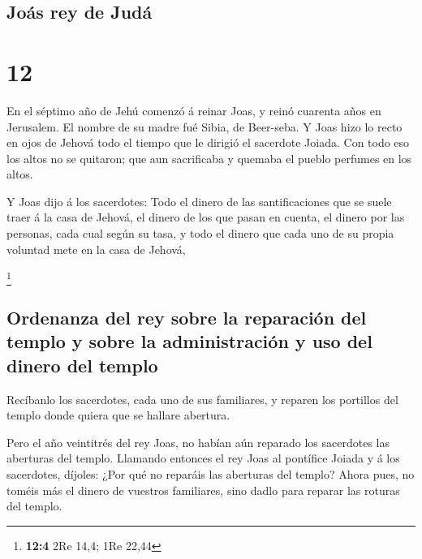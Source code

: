 \hypertarget{jouxe1s-rey-de-juduxe1}{%
\subsection{Joás rey de Judá}\label{jouxe1s-rey-de-juduxe1}}

\hypertarget{section-11}{%
\section{12}\label{section-11}}

 En el séptimo año de Jehú comenzó á reinar Joas, y reinó
cuarenta años en Jerusalem. El nombre de su madre fué Sibia, de
Beer-seba.  Y Joas hizo lo recto en ojos de Jehová todo el
tiempo que le dirigió el sacerdote Joiada.  Con todo eso los
altos no se quitaron; que aun sacrificaba y quemaba el pueblo perfumes
en los altos.

 Y Joas dijo á los sacerdotes: Todo el dinero de las
santificaciones que se suele traer á la casa de Jehová, el dinero de los
que pasan en cuenta, el dinero por las personas, cada cual según su
tasa, y todo el dinero que cada uno de su propia voluntad mete en la
casa de Jehová,

\footnote{\textbf{12:4} 2Re 14,4; 1Re 22,44}

\hypertarget{ordenanza-del-rey-sobre-la-reparaciuxf3n-del-templo-y-sobre-la-administraciuxf3n-y-uso-del-dinero-del-templo}{%
\subsection{Ordenanza del rey sobre la reparación del templo y sobre la
administración y uso del dinero del
templo}\label{ordenanza-del-rey-sobre-la-reparaciuxf3n-del-templo-y-sobre-la-administraciuxf3n-y-uso-del-dinero-del-templo}}

 Recíbanlo los sacerdotes, cada uno de sus familiares, y
reparen los portillos del templo donde quiera que se hallare abertura.

 Pero el año veintitrés del rey Joas, no habían aún reparado
los sacerdotes las aberturas del templo.  Llamando entonces
el rey Joas al pontífice Joiada y á los sacerdotes, díjoles: ¿Por qué no
reparáis las aberturas del templo? Ahora pues, no toméis más el dinero
de vuestros familiares, sino dadlo para reparar las roturas del templo.

